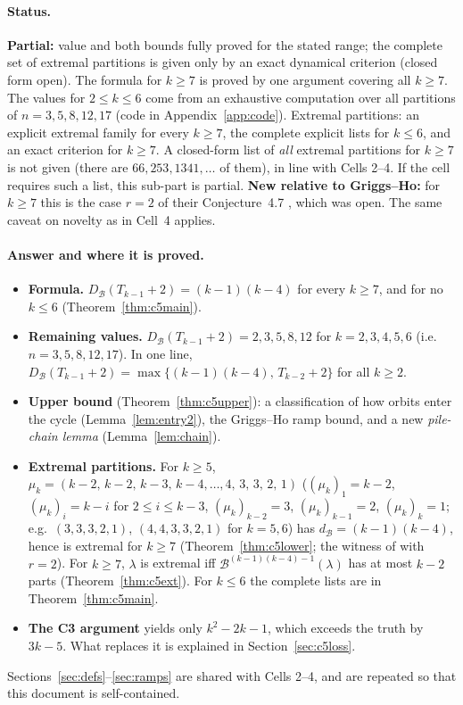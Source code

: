 \documentclass[11pt]{article}
\theoremstyle{definition}
\newcommand{\B}{\mathcal{B}}
\newcommand{\dB}{d_{\mathcal{B}}}
\newcommand{\DB}{D_{\mathcal{B}}}
\renewcommand{\le}{\leqslant}
\renewcommand{\ge}{\geqslant}
\begin{document}
\paragraph{Status.} \textbf{Partial:} value and both bounds fully proved for the stated range; the complete set of extremal partitions is given only by an exact dynamical criterion (closed form open).
  The formula for $k\ge7$ is proved by one argument covering all $k\ge7$.  The values for
$2\le k\le6$ come from an exhaustive computation over all partitions of $n=3,5,8,12,17$ (code in
Appendix~\ref{app:code}).  Extremal partitions: an explicit extremal family for every $k\ge7$, the complete explicit
lists for $k\le6$, and an exact criterion for $k\ge7$.  A closed-form list of \emph{all} extremal partitions for $k\ge7$ is not given (there are $66,253,1341,\dots$ of
them), in line with Cells 2--4.  If the cell requires such a list, this sub-part is partial.
\textbf{New relative to Griggs--Ho:} for $k\ge7$ this is the case $r=2$ of their Conjecture~4.7 \cite{GH}, which was
open.  The same caveat on novelty as in Cell~4 applies.

\paragraph{Answer and where it is proved.}
\begin{itemize}
\item \textbf{Formula.}  $\DB(T_{k-1}+2)=(k-1)(k-4)$ for every $k\ge7$, and for no $k\le6$ (Theorem~\ref{thm:c5main}).
\item \textbf{Remaining values.}  $\DB(T_{k-1}+2)=2,3,5,8,12$ for $k=2,3,4,5,6$ (i.e.\ $n=3,5,8,12,17$).  In one line,
$\DB(T_{k-1}+2)=\max\{(k-1)(k-4),\,T_{k-2}+2\}$ for all $k\ge2$.
\item \textbf{Upper bound} (Theorem~\ref{thm:c5upper}): a classification of how orbits enter the cycle
(Lemma~\ref{lem:entry2}), the Griggs--Ho ramp bound, and a new \emph{pile-chain lemma} (Lemma~\ref{lem:chain}).
\item \textbf{Extremal partitions.}  For $k\ge5$,
$\mu_k=(k-2,\,k-2,\,k-3,\,k-4,\dots,4,\,3,\,3,\,2,\,1)$ ($(\mu_k)_1=k-2$, $(\mu_k)_i=k-i$ for $2\le i\le k-3$,
$(\mu_k)_{k-2}=3$, $(\mu_k)_{k-1}=2$, $(\mu_k)_k=1$; e.g.\ $(3,3,3,2,1)$, $(4,4,3,3,2,1)$ for $k=5,6$) has
$\dB=(k-1)(k-4)$, hence is extremal for $k\ge7$ (Theorem~\ref{thm:c5lower}; the witness of
\cite[Thm.~4.5, case (1)]{GH} with $r=2$).  For $k\ge7$, $\lambda$ is extremal iff $\B^{(k-1)(k-4)-1}(\lambda)$ has at most
$k-2$ parts (Theorem~\ref{thm:c5ext}).  For $k\le6$ the complete lists are in Theorem~\ref{thm:c5main}.
\item \textbf{The C3 argument} yields only $k^2-2k-1$, which exceeds the truth by $3k-5$.  What replaces it is
explained in Section~\ref{sec:c5loss}.
\end{itemize}
Sections~\ref{sec:defs}--\ref{sec:ramps} are shared with Cells 2--4, and are repeated so that this document is
self-contained.
\end{document}
